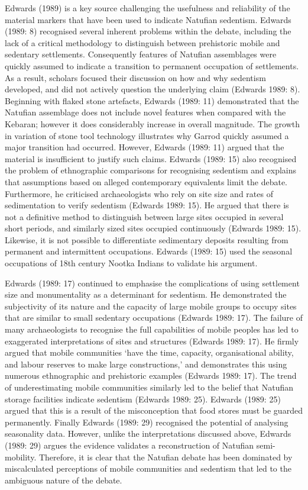 \documentclass[%
	]{ijsra}
\begin{document}
Edwards (1989) is a key source challenging the usefulness and reliability of the material markers that have been used to indicate Natufian sedentism. Edwards (1989: 8) recognised several inherent problems within the debate, including the lack of a critical methodology to distinguish between prehistoric mobile and sedentary settlements. Consequently features of Natufian assemblages were quickly assumed to indicate a transition to permanent occupation of settlements. As a result, scholars focused their discussion on how and why sedentism developed, and did not actively question the underlying claim (Edwards 1989: 8). Beginning with flaked stone artefacts, Edwards (1989: 11) demonstrated that the Natufian assemblage does not include novel features when compared with the Kebaran; however it does considerably increase in overall magnitude. The growth in variation of stone tool technology illustrates why Garrod quickly assumed a major transition had occurred. However, Edwards (1989: 11) argued that the material is insufficient to justify such claims. Edwards (1989: 15) also recognised the problem of ethnographic comparisons for recognising sedentism and explains that assumptions based on alleged contemporary equivalents limit the debate. Furthermore, he criticised archaeologists who rely on site size and rates of sedimentation to verify sedentism (Edwards 1989: 15). He argued that there is not a definitive method to distinguish between large sites occupied in several short periods, and similarly sized sites occupied continuously (Edwards 1989: 15). Likewise, it is not possible to differentiate sedimentary deposits resulting from permanent and intermittent occupations. Edwards (1989: 15) used the seasonal occupations of 18th century Nootka Indians to validate his argument. 

Edwards (1989: 17) continued to emphasise the complications of using settlement size and monumentality as a determinant for sedentism. He demonstrated the subjectivity of its nature and the capacity of large mobile groups to occupy sites that are similar to small sedentary occupations (Edwards 1989: 17). The failure of many archaeologists to recognise the full capabilities of mobile peoples has led to exaggerated interpretations of sites and structures (Edwards 1989: 17). He firmly argued that mobile communities ‘have the time, capacity, organisational ability, and labour reserves to make large constructions,’ and demonstrates this using numerous ethnographic and prehistoric examples (Edwards 1989: 17). The trend of underestimating mobile communities similarly led to the belief that Natufian storage facilities indicate sedentism (Edwards 1989: 25). Edwards (1989: 25) argued that this is a result of the misconception that food stores must be guarded permanently. Finally Edwards (1989: 29) recognised the potential of analysing seasonality data. However, unlike the interpretations discussed above, Edwards (1989: 29) argues the evidence validates a reconstruction of Natufian semi-mobility. Therefore, it is clear that the Natufian debate has been dominated by miscalculated perceptions of mobile communities and sedentism that led to the ambiguous nature of the debate.
\end{document}
